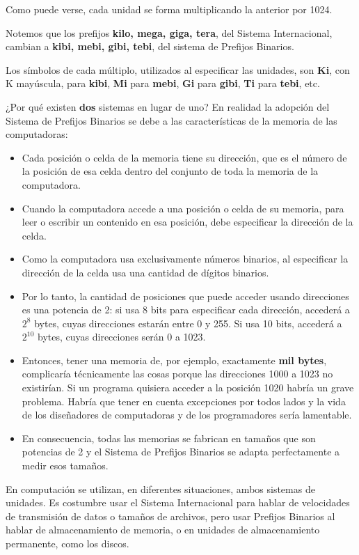 \documentclass[spanish,a4paper,]{article}
\providecommand{\tightlist}{%
  \setlength{\itemsep}{0pt}\setlength{\parskip}{0pt}}
\begin{document}
Como puede verse, cada unidad se forma multiplicando la anterior por
1024.

Notemos que los prefijos \textbf{kilo, mega, giga, tera}, del Sistema
Internacional, cambian a \textbf{kibi, mebi, gibi, tebi}, del sistema de
Prefijos Binarios.

Los símbolos de cada múltiplo, utilizados al especificar las unidades,
son \textbf{Ki}, con K mayúscula, para \textbf{kibi}, \textbf{Mi} para
\textbf{mebi}, \textbf{Gi} para \textbf{gibi}, \textbf{Ti} para
\textbf{tebi}, etc.

¿Por qué existen \textbf{dos} sistemas en lugar de uno? En realidad la
adopción del Sistema de Prefijos Binarios se debe a las características
de la memoria de las computadoras:

\begin{itemize}
\tightlist
\item
  Cada posición o celda de la memoria tiene su dirección, que es el
  número de la posición de esa celda dentro del conjunto de toda la
  memoria de la computadora.
\item
  Cuando la computadora accede a una posición o celda de su memoria,
  para leer o escribir un contenido en esa posición, debe especificar la
  dirección de la celda.
\item
  Como la computadora usa exclusivamente números binarios, al
  especificar la dirección de la celda usa una cantidad de dígitos
  binarios.
\item
  Por lo tanto, la cantidad de posiciones que puede acceder usando
  direcciones es una potencia de 2: si usa 8 bits para especificar cada
  dirección, accederá a \(2^8\) bytes, cuyas direcciones estarán entre 0
  y 255. Si usa 10 bits, accederá a \(2^{10}\) bytes, cuyas direcciones
  serán 0 a 1023.
\item
  Entonces, tener una memoria de, por ejemplo, exactamente \textbf{mil
  bytes}, complicaría técnicamente las cosas porque las direcciones 1000
  a 1023 no existirían. Si un programa quisiera acceder a la posición
  1020 habría un grave problema. Habría que tener en cuenta excepciones
  por todos lados y la vida de los diseñadores de computadoras y de los
  programadores sería lamentable.
\item
  En consecuencia, todas las memorias se fabrican en tamaños que son
  potencias de 2 y el Sistema de Prefijos Binarios se adapta
  perfectamente a medir esos tamaños.
\end{itemize}

En computación se utilizan, en diferentes situaciones, ambos sistemas de
unidades. Es costumbre usar el Sistema Internacional para hablar de
velocidades de transmisión de datos o tamaños de archivos, pero usar
Prefijos Binarios al hablar de almacenamiento de memoria, o en unidades
de almacenamiento permanente, como los discos.
\end{document}
